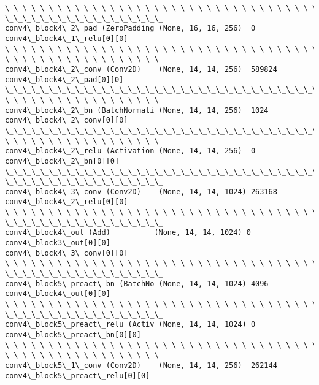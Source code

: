 \documentclass[11pt]{article}
\begin{document}
\begin{Verbatim}[commandchars=\\\{\}]
\_\_\_\_\_\_\_\_\_\_\_\_\_\_\_\_\_\_\_\_\_\_\_\_\_\_\_\_\_\_\_\_\_\_\_\_\_\_\_\_\_\_\_\_\_\_\_\_\_\_\_\_\_\_\_\_\_\_\_\_\_\_\_\_\_\_\_\_\_\_\_\_\_\_\_\_\_\_\_\_
\_\_\_\_\_\_\_\_\_\_\_\_\_\_\_\_\_\_
conv4\_block4\_2\_pad (ZeroPadding (None, 16, 16, 256)  0
conv4\_block4\_1\_relu[0][0]
\_\_\_\_\_\_\_\_\_\_\_\_\_\_\_\_\_\_\_\_\_\_\_\_\_\_\_\_\_\_\_\_\_\_\_\_\_\_\_\_\_\_\_\_\_\_\_\_\_\_\_\_\_\_\_\_\_\_\_\_\_\_\_\_\_\_\_\_\_\_\_\_\_\_\_\_\_\_\_\_
\_\_\_\_\_\_\_\_\_\_\_\_\_\_\_\_\_\_
conv4\_block4\_2\_conv (Conv2D)    (None, 14, 14, 256)  589824
conv4\_block4\_2\_pad[0][0]
\_\_\_\_\_\_\_\_\_\_\_\_\_\_\_\_\_\_\_\_\_\_\_\_\_\_\_\_\_\_\_\_\_\_\_\_\_\_\_\_\_\_\_\_\_\_\_\_\_\_\_\_\_\_\_\_\_\_\_\_\_\_\_\_\_\_\_\_\_\_\_\_\_\_\_\_\_\_\_\_
\_\_\_\_\_\_\_\_\_\_\_\_\_\_\_\_\_\_
conv4\_block4\_2\_bn (BatchNormali (None, 14, 14, 256)  1024
conv4\_block4\_2\_conv[0][0]
\_\_\_\_\_\_\_\_\_\_\_\_\_\_\_\_\_\_\_\_\_\_\_\_\_\_\_\_\_\_\_\_\_\_\_\_\_\_\_\_\_\_\_\_\_\_\_\_\_\_\_\_\_\_\_\_\_\_\_\_\_\_\_\_\_\_\_\_\_\_\_\_\_\_\_\_\_\_\_\_
\_\_\_\_\_\_\_\_\_\_\_\_\_\_\_\_\_\_
conv4\_block4\_2\_relu (Activation (None, 14, 14, 256)  0
conv4\_block4\_2\_bn[0][0]
\_\_\_\_\_\_\_\_\_\_\_\_\_\_\_\_\_\_\_\_\_\_\_\_\_\_\_\_\_\_\_\_\_\_\_\_\_\_\_\_\_\_\_\_\_\_\_\_\_\_\_\_\_\_\_\_\_\_\_\_\_\_\_\_\_\_\_\_\_\_\_\_\_\_\_\_\_\_\_\_
\_\_\_\_\_\_\_\_\_\_\_\_\_\_\_\_\_\_
conv4\_block4\_3\_conv (Conv2D)    (None, 14, 14, 1024) 263168
conv4\_block4\_2\_relu[0][0]
\_\_\_\_\_\_\_\_\_\_\_\_\_\_\_\_\_\_\_\_\_\_\_\_\_\_\_\_\_\_\_\_\_\_\_\_\_\_\_\_\_\_\_\_\_\_\_\_\_\_\_\_\_\_\_\_\_\_\_\_\_\_\_\_\_\_\_\_\_\_\_\_\_\_\_\_\_\_\_\_
\_\_\_\_\_\_\_\_\_\_\_\_\_\_\_\_\_\_
conv4\_block4\_out (Add)          (None, 14, 14, 1024) 0
conv4\_block3\_out[0][0]
conv4\_block4\_3\_conv[0][0]
\_\_\_\_\_\_\_\_\_\_\_\_\_\_\_\_\_\_\_\_\_\_\_\_\_\_\_\_\_\_\_\_\_\_\_\_\_\_\_\_\_\_\_\_\_\_\_\_\_\_\_\_\_\_\_\_\_\_\_\_\_\_\_\_\_\_\_\_\_\_\_\_\_\_\_\_\_\_\_\_
\_\_\_\_\_\_\_\_\_\_\_\_\_\_\_\_\_\_
conv4\_block5\_preact\_bn (BatchNo (None, 14, 14, 1024) 4096
conv4\_block4\_out[0][0]
\_\_\_\_\_\_\_\_\_\_\_\_\_\_\_\_\_\_\_\_\_\_\_\_\_\_\_\_\_\_\_\_\_\_\_\_\_\_\_\_\_\_\_\_\_\_\_\_\_\_\_\_\_\_\_\_\_\_\_\_\_\_\_\_\_\_\_\_\_\_\_\_\_\_\_\_\_\_\_\_
\_\_\_\_\_\_\_\_\_\_\_\_\_\_\_\_\_\_
conv4\_block5\_preact\_relu (Activ (None, 14, 14, 1024) 0
conv4\_block5\_preact\_bn[0][0]
\_\_\_\_\_\_\_\_\_\_\_\_\_\_\_\_\_\_\_\_\_\_\_\_\_\_\_\_\_\_\_\_\_\_\_\_\_\_\_\_\_\_\_\_\_\_\_\_\_\_\_\_\_\_\_\_\_\_\_\_\_\_\_\_\_\_\_\_\_\_\_\_\_\_\_\_\_\_\_\_
\_\_\_\_\_\_\_\_\_\_\_\_\_\_\_\_\_\_
conv4\_block5\_1\_conv (Conv2D)    (None, 14, 14, 256)  262144
conv4\_block5\_preact\_relu[0][0]

\end{Verbatim}
\end{document}
